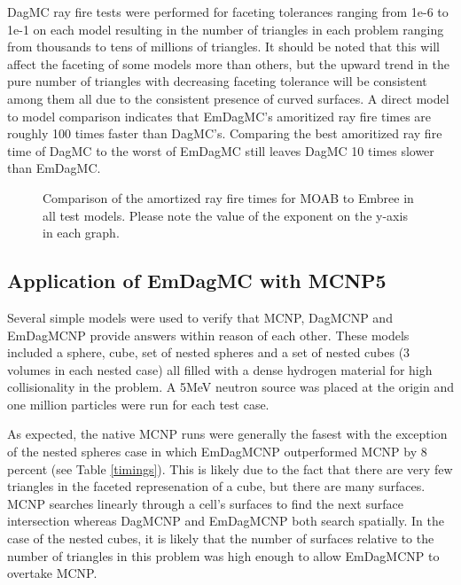 \documentclass{anstrans}
\begin{document}
DagMC ray fire tests were performed for faceting tolerances ranging from 1e-6 to 1e-1 on each model resulting in the number of triangles in each problem ranging from thousands to tens of millions of triangles. It should be noted that this will affect the faceting of some models more than others, but the upward trend in the pure number of triangles with decreasing faceting tolerance will be consistent among them all due to the consistent presence of curved surfaces. A direct model to model comparison indicates that EmDagMC's amoritized ray fire times are roughly 100 times faster than DagMC's. Comparing the best amoritized ray fire time of DagMC to the worst of EmDagMC  still leaves DagMC 10 times slower than EmDagMC.

\begin{figure}[H]

  \begin{center}
    
    \caption{Comparison of the amortized ray fire times for MOAB to Embree in all test models. Please note the value of the exponent on the y-axis in each graph.}
    
  \end{center}

\end{figure}

\subsection{Application of EmDagMC with MCNP5}

Several simple models were used to verify that MCNP, DagMCNP and EmDagMCNP provide answers within reason of each other. These models included a sphere, cube, set of nested spheres and a set of nested cubes (3 volumes in each nested case) all filled with a dense hydrogen material for high collisionality in the problem. A 5MeV neutron source was placed at the origin and one million particles were run for each test case.

As expected, the native MCNP runs were generally the fasest with the exception of the nested spheres case in which EmDagMCNP outperformed MCNP by 8 percent (see Table \ref{timings}). This is likely due to the fact that there are very few triangles in the faceted represenation of a cube, but there are many surfaces. MCNP searches linearly through a cell's surfaces to find the next surface intersection whereas DagMCNP and EmDagMCNP both search spatially. In the case of the nested cubes, it is likely that the number of surfaces relative to the number of triangles in this problem was high enough to allow EmDagMCNP to overtake MCNP.
\end{document}
